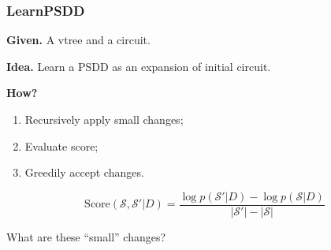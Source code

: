 \documentclass[usenames,dvipsnames]{beamer}
\begin{document}
\begin{frame}
  \frametitle{LearnPSDD}

  \textbf{Given.} A vtree and a circuit.
  \vskip 0.25cm

  \textbf{Idea.} Learn a PSDD as an expansion of initial circuit.
  \vskip 0.25cm

  \textbf{How?}
  \begin{enumerate}
    \item Recursively apply small changes;
    \item Evaluate score;
    \item Greedily accept changes.
  \end{enumerate}
  \vskip 0.5cm

  \begin{equation*}
    \text{Score}(\mathcal{S},\mathcal{S}'|D)=\frac{\log p(\mathcal{S}'|D) - \log
    p(\mathcal{S}|D)}{|\mathcal{S}'|-|\mathcal{S}|}
  \end{equation*}
  \vskip 0.5cm

  What are these ``small'' changes?
  \vskip 0.5cm

  \hfill\cite{liang17}
\end{frame}
\end{document}
